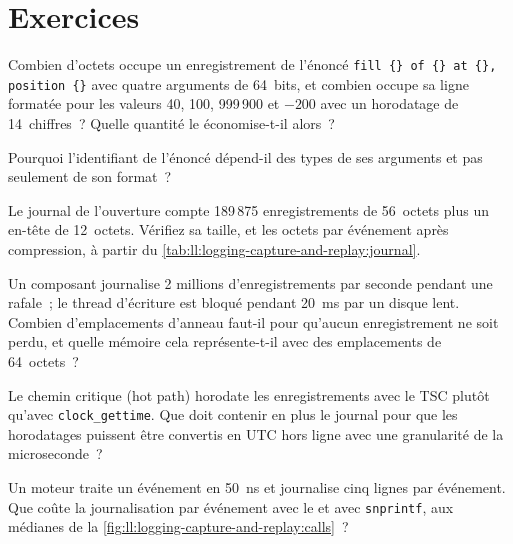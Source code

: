 \section{Exercices}

\begin{exercise}[$\star$]\label{exo:ll:logging-capture-and-replay:1}
Combien d'octets occupe un enregistrement de l'énoncé \texttt{\textquotedbl{}fill \{\} of \{\} at \{\}, position \{\}\textquotedbl{}} avec quatre arguments de 64~bits,
et combien occupe sa ligne formatée pour les valeurs 40, 100, 999\,900 et $-200$ avec un horodatage de 14~chiffres~? Quelle quantité
le  économise-t-il alors~?
\end{exercise}

\begin{exercise}[$\star$]\label{exo:ll:logging-capture-and-replay:2}
Pourquoi l'identifiant de l'énoncé dépend-il des types de ses arguments et pas seulement de son format~?
\end{exercise}

\begin{exercise}[$\star$]\label{exo:ll:logging-capture-and-replay:3}
Le journal de l'ouverture compte 189\,875 enregistrements de 56~octets plus un en-tête de 12~octets. Vérifiez sa taille, et les octets par événement
après compression, à partir du \cref{tab:ll:logging-capture-and-replay:journal}.
\end{exercise}

\begin{exercise}[$\star\star$]\label{exo:ll:logging-capture-and-replay:4}
Un composant journalise 2 millions d'enregistrements par seconde pendant une rafale~; le thread d'écriture est bloqué pendant \qty{20}{\milli\second} par
un disque lent. Combien d'emplacements d'anneau faut-il pour qu'aucun enregistrement ne soit perdu, et quelle mémoire cela représente-t-il avec des emplacements de 64~octets~?
\end{exercise}

\begin{exercise}[$\star\star$]\label{exo:ll:logging-capture-and-replay:5}
Le chemin critique (hot path) horodate les enregistrements avec le TSC plutôt qu'avec \texttt{clock\_gettime}. Que doit contenir en plus le journal pour que les
horodatages puissent être convertis en UTC hors ligne avec une granularité de la microseconde~?
\end{exercise}

\begin{exercise}[$\star\star$]\label{exo:ll:logging-capture-and-replay:6}
Un moteur traite un événement en \qty{50}{\nano\second} et journalise cinq lignes par événement. Que coûte la journalisation par événement avec le
 et avec \texttt{snprintf}, aux médianes de la \cref{fig:ll:logging-capture-and-replay:calls}~?
\end{exercise}


